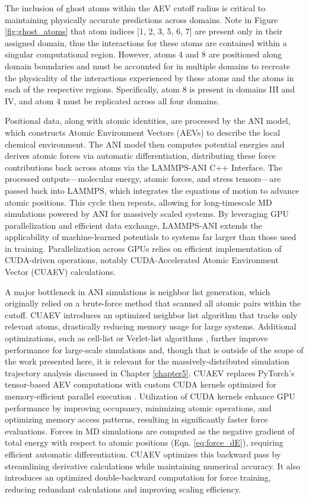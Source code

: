 The inclusion of ghost atoms within the AEV cutoff radius is critical to maintaining physically accurate predictions across domains.
Note in Figure \ref{fig:ghost_atoms} that atom indices [1, 2, 3, 5, 6, 7] are present only in their assigned domain, thus the interactions for these atoms are contained within a singular computational region.
However, atoms 4 and 8 are positioned along domain boundaries and must be accounted for in multiple domains to recreate the physicality of the interactions experienced by these atoms and the atoms in each of the respective regions.
Specifically, atom 8 is present in domains III and IV, and atom 4 must be replicated across all four domains.

Positional data, along with atomic identities, are processed by the ANI model, which constructs Atomic Environment Vectors (AEVs) to describe the local chemical environment. 
The ANI model then computes potential energies and derives atomic forces via automatic differentiation, distributing these force contributions back across atoms via the LAMMPS-ANI C++ Interface. 
The processed outputs—molecular energy, atomic forces, and stress tensors—are passed back into LAMMPS, which integrates the equations of motion to advance atomic positions. 
This cycle then repeats, allowing for long-timescale MD simulations powered by ANI for massively scaled systems.
By leveraging GPU parallelization and efficient data exchange, LAMMPS-ANI extends the applicability of machine-learned potentials to systems far larger than those used in training. 
Parallelization across GPUs relies on efficient implementation of CUDA-driven operations, notably CUDA-Accelerated Atomic Environment Vector (CUAEV) \cite{torchani_2.0} calculations.

A major bottleneck in ANI simulations is neighbor list generation, which originally relied on a brute-force method that scanned all atomic pairs within the cutoff. 
CUAEV introduces an optimized neighbor list algorithm that tracks only relevant atoms, drastically reducing memory usage for large systems. 
Additional optimizations, such as cell-list or Verlet-list algorithms \cite{allen_book}, further improve performance for large-scale simulations and, though that is outside of the scope of the work presented here, it is relevant for the massively-distributed simulation trajectory analysis discussed in Chapter \ref{chapter5}.
CUAEV replaces PyTorch’s tensor-based AEV computations with custom CUDA kernels optimized for memory-efficient parallel execution \cite{torchani_2.0}. 
Utilization of CUDA kernels enhance GPU performance by improving occupancy, minimizing atomic operations, and optimizing memory access patterns, resulting in significantly faster force evaluations. 
Forces in MD simulations are computed as the negative gradient of total energy with respect to atomic positions (Eqn. \ref{eq:force_dE}), requiring efficient automatic differentiation.
CUAEV optimizes this backward pass by streamlining derivative calculations while maintaining numerical accuracy. 
It also introduces an optimized double-backward computation for force training, reducing redundant calculations and improving scaling efficiency.


